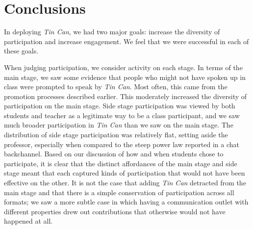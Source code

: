 
\section{Conclusions}


In deploying \emph{Tin Can}, we had two major goals: increase the diversity of participation and increase engagement.  We feel that we were successful in each of these goals.

When judging participation, we consider activity on each stage. In terms of the main stage, we saw some evidence that people who might not have spoken up in class were prompted to speak by \emph{Tin Can}. Most often, this came from the promotion processes described earlier. This moderately increased the diversity of participation on the main stage. Side stage participation was viewed by both students and teacher as a legitimate way to be a class participant, and we saw much broader participation in \emph{Tin Can} than we saw on the main stage. The distribution of side stage participation was relatively flat, setting aside the professor, especially  when compared to the steep power law reported in a chat backchannel. \citep{Yardi:2006uk}  Based on our discussion of how and when students chose to participate, it is clear that the distinct affordances of the main stage and side stage meant that each captured kinds of participation that would not have been effective on the other. It is not the case that adding \emph{Tin Can} detracted from the main stage and that there is a simple conservation of participation across all formats; we saw a more subtle case in which having a communication outlet with different properties drew out contributions that otherwise would not have happened at all.


